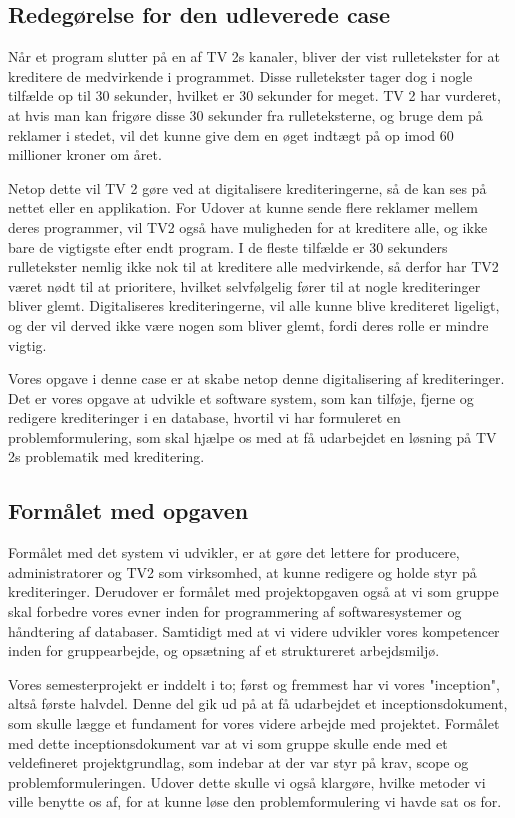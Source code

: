 \subsection{Redegørelse for den udleverede case}
Når et program slutter på en af TV 2s kanaler, bliver der vist rulletekster for at kreditere de medvirkende i programmet. Disse rulletekster tager dog i nogle tilfælde op til 30 sekunder, hvilket er 30 sekunder for meget. TV 2 har vurderet, at hvis man kan frigøre disse 30 sekunder fra rulleteksterne, og bruge dem på reklamer i stedet, vil det kunne give dem en øget indtægt på op imod 60 millioner kroner om året. \cite{url_case}

Netop dette vil TV 2 gøre ved at digitalisere krediteringerne, så de kan ses på nettet eller en applikation. For Udover at kunne sende flere reklamer mellem deres programmer, vil TV2 også have muligheden for at kreditere alle, og ikke bare de vigtigste efter endt program. I de fleste tilfælde er 30 sekunders rulletekster nemlig ikke nok til at kreditere alle medvirkende, så derfor har TV2 været nødt til at prioritere, hvilket selvfølgelig fører til at nogle krediteringer bliver glemt. Digitaliseres krediteringerne, vil alle kunne blive krediteret ligeligt, og der vil derved ikke være nogen som bliver glemt, fordi deres rolle er mindre vigtig.

Vores opgave i denne case er at skabe netop denne digitalisering af krediteringer. Det er vores opgave at udvikle et software system, som kan tilføje, fjerne og redigere krediteringer i en database, hvortil vi har formuleret en problemformulering, som skal hjælpe os med at få udarbejdet en løsning på TV 2s problematik med kreditering.

\subsection{Formålet med opgaven}
Formålet med det system vi udvikler, er at gøre det lettere for producere, administratorer og TV2 som virksomhed, at kunne redigere og holde styr på krediteringer. Derudover er formålet med projektopgaven også at vi som gruppe skal forbedre vores evner inden for programmering af softwaresystemer og håndtering af databaser. Samtidigt med at vi videre udvikler vores kompetencer inden for gruppearbejde, og opsætning af et struktureret arbejdsmiljø.

Vores semesterprojekt er inddelt i to; først og fremmest har vi vores "inception", altså første halvdel. Denne del gik ud på at få udarbejdet et inceptionsdokument, som skulle lægge et fundament for vores videre arbejde med projektet. Formålet med dette inceptionsdokument var at vi som gruppe skulle ende med et veldefineret projektgrundlag, som indebar at der var styr på krav, scope og problemformuleringen. Udover dette skulle vi også klargøre, hvilke metoder vi ville benytte os af, for at kunne løse den problemformulering vi havde sat os for.

